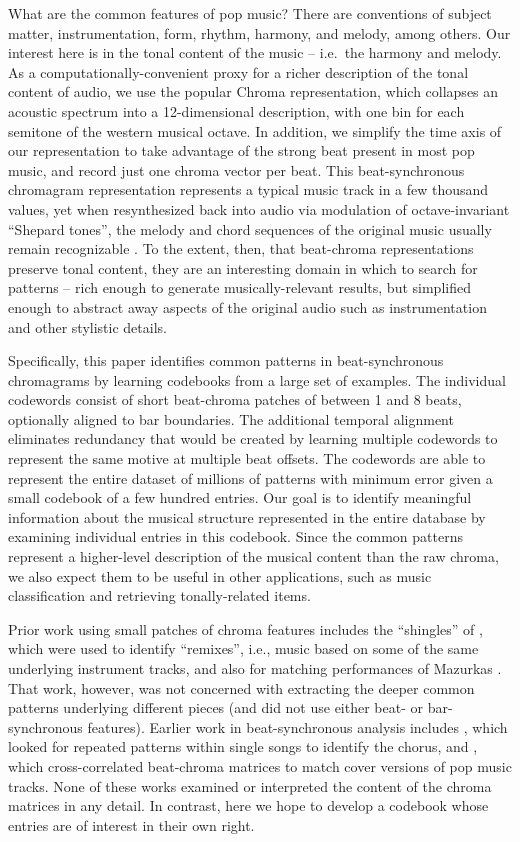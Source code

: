 \documentclass{article}
\newcommand{\ie}{i.e.~}
\begin{document}
What are the common features of pop music?  There are conventions
of subject matter, instrumentation, form, rhythm, harmony, and melody, among
others.  Our interest here is in the tonal content of the music -- \ie the
harmony and melody.  As a computationally-convenient proxy for a richer
description of the tonal content of audio, we use the popular Chroma
representation, which collapses an acoustic spectrum into a 12-dimensional
description, with one bin for each semitone of the western musical octave.
In addition, we simplify the time axis of our representation to take advantage
of the strong beat present in most pop music, and record just one
chroma vector per beat.  This beat-synchronous chromagram
representation represents a typical music track
in a few thousand values, yet when resynthesized back into audio via
modulation of octave-invariant ``Shepard tones'', the melody and
chord sequences of the original music usually remain recognizable
\cite{Ellis2007a}.  To the extent, then, that beat-chroma
representations preserve tonal content, they
are an interesting domain in which to search for patterns -- rich enough
to generate musically-relevant results, but simplified enough to
abstract away aspects of the original audio such as
instrumentation and other stylistic details.

Specifically, this paper identifies common patterns in beat-synchronous
chromagrams by learning codebooks from a large set of examples.
The individual codewords consist of short beat-chroma patches of
between 1 and 8 beats, optionally aligned to bar boundaries.
%
The additional temporal alignment eliminates redundancy that would be
created by learning multiple codewords to represent the same motive at
multiple beat offsets.
%
The codewords are able to represent the entire dataset
of millions of patterns with minimum error given a small codebook of
a few hundred entries.
%
Our goal is to identify meaningful information
about the musical structure represented in the entire database by
examining individual entries in this codebook.  Since the common
patterns represent a higher-level description of the musical content
than the raw chroma,
we also expect them to be useful in other applications, such as
music classification and retrieving tonally-related items.

Prior work using small patches of chroma features includes
the ``shingles'' of \cite{Casey2007}, which were used to
identify ``remixes'', i.e., music based on some of the same
underlying instrument tracks, and also for matching
performances of Mazurkas \cite{Casey2008}.  That work,
however, was not concerned with extracting the deeper
common patterns underlying different pieces (and did not
use either beat- or bar-synchronous features).  Earlier work in
beat-synchronous analysis includes \cite{Bartsch2001},
which looked for repeated patterns within single songs to
identify the chorus, and \cite{Ellis2007a}, which 
cross-correlated beat-chroma matrices to match cover
versions of pop music tracks.  None of these works
examined or interpreted the content of the chroma
matrices in any detail.  In contrast, here we hope to
develop a codebook whose entries are of interest
in their own right.
\end{document}
